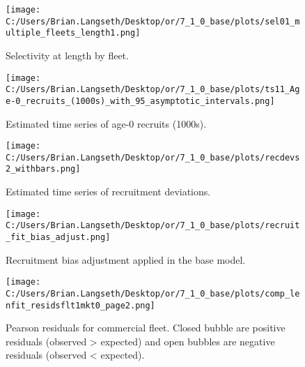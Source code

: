 \documentclass[11pt,
  english,
  a4paper,
]{article}
\begin{document}
\begin{figure}
\centering
\texttt{[image: C:/Users/Brian.Langseth/Desktop/or/7\_1\_0\_base/plots/sel01\_multiple\_fleets\_length1.png]}
\caption{Selectivity at length by fleet.\label{fig:selex}}
\end{figure}

\tagmcend\tagstructend


\begin{figure}
\centering
\texttt{[image: C:/Users/Brian.Langseth/Desktop/or/7\_1\_0\_base/plots/ts11\_Age-0\_recruits\_(1000s)\_with\_95\_asymptotic\_intervals.png]}
\caption{Estimated time series of age-0 recruits (1000s).\label{fig:recruits}}
\end{figure}

\tagmcend\tagstructend


\begin{figure}
\centering
\texttt{[image: C:/Users/Brian.Langseth/Desktop/or/7\_1\_0\_base/plots/recdevs2\_withbars.png]}
\caption{Estimated time series of recruitment deviations.\label{fig:rec-devs}}
\end{figure}

\tagmcend\tagstructend


\begin{figure}
\centering
\texttt{[image: C:/Users/Brian.Langseth/Desktop/or/7\_1\_0\_base/plots/recruit\_fit\_bias\_adjust.png]}
\caption{Recruitment bias adjustment applied in the base model.\label{fig:bias-adj}}
\end{figure}

\tagmcend\tagstructend


\begin{figure}
\centering
\texttt{[image: C:/Users/Brian.Langseth/Desktop/or/7\_1\_0\_base/plots/comp\_lenfit\_residsflt1mkt0\_page2.png]}
\caption{Pearson residuals for commercial fleet. Closed bubble are positive residuals (observed \textgreater{} expected) and open bubbles are negative residuals (observed \textless{} expected).\label{fig:com-pearson}}
\end{figure}
\end{document}
